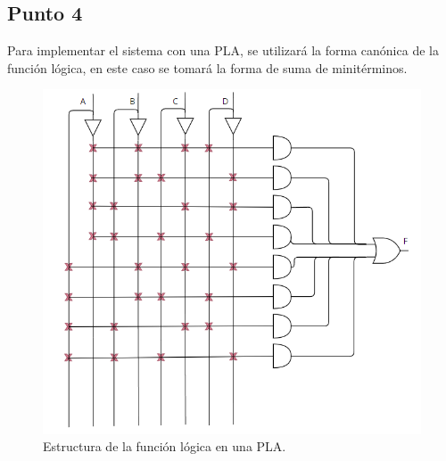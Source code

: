 \subsection*{Punto 4}
Para implementar el sistema con una PLA, se utilizará la forma canónica de la función lógica, en este caso se tomará la forma de suma de minitérminos.

\begin{figure}[h]
    \centering
    \includegraphics[scale=0.65]{img/plaej.png}
    \caption{Estructura de la función lógica en una PLA.}
\end{figure}